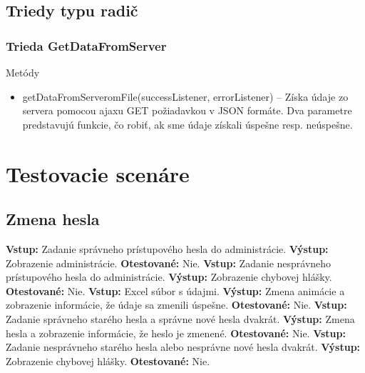 \documentclass[12pt,a4paper]{report}
\begin{document}
\section[Triedy typu radič]{\rmfamily\bfseries
	Triedy typu radič}

\subsection[Trieda GetDataFromServer]{\rmfamily\bfseries
	Trieda GetDataFromServer}
Metódy
\begin{itemize}
	\item getDataFromServeromFile(successListener, errorListener) – Získa údaje zo servera pomocou ajaxu GET požiadavkou v JSON formáte. Dva parametre predstavujú funkcie, čo robiť, ak sme údaje získali úspešne resp. neúspešne.
\end{itemize}

\chapter[Testovacie scenáre]{\rmfamily\bfseries
	Testovacie scenáre}

\section[Zmena hesla alebo údajov]{\rmfamily\bfseries
	Zmena hesla}

\begin{flushleft}
\textbf{Vstup:} Zadanie správneho prístupového hesla do administrácie.\linebreak
\textbf{Výstup:} Zobrazenie administrácie.\linebreak
\textbf{Otestované:} Nie.\linebreak
\linebreak
\textbf{Vstup:} Zadanie nesprávneho prístupového hesla do administrácie.\linebreak
\textbf{Výstup:} Zobrazenie chybovej hlášky.\linebreak
\textbf{Otestované:} Nie.\linebreak
\linebreak
\textbf{Vstup:} Excel súbor s údajmi.\linebreak
\textbf{Výstup:} Zmena animácie a zobrazenie informácie, že údaje sa zmenili úspešne.\linebreak
\textbf{Otestované:} Nie.\linebreak
\linebreak
\textbf{Vstup:} Zadanie správneho starého hesla a správne nové hesla dvakrát.\linebreak
\textbf{Výstup:} Zmena hesla a zobrazenie informácie, že heslo je zmenené.\linebreak
\textbf{Otestované:} Nie.\linebreak
\linebreak
\textbf{Vstup:} Zadanie nesprávneho starého hesla alebo nesprávne nové hesla dvakrát.\linebreak
\textbf{Výstup:} Zobrazenie chybovej hlášky.\linebreak
\textbf{Otestované:} Nie.\linebreak
\end{flushleft}
\end{document}
